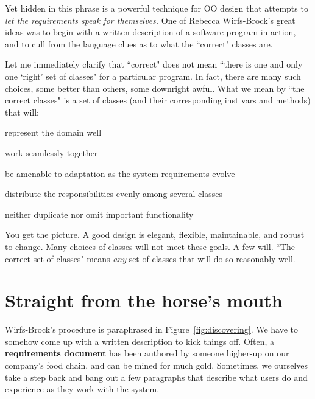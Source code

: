 Yet hidden in this phrase is a powerful technique for OO design that attempts
to \textit{let the requirements speak for themselves.} One of Rebecca
Wirfs-Brock's great ideas was to begin with a written description of a
software program in action, and to cull from the language clues as to what the
``correct" classes are.

Let me immediately clarify that ``correct" does not mean ``there is one and
only one `right' set of classes" for a particular program. In fact, there are
many such choices, some better than others, some downright awful. What we
mean by ``the correct classes" is a set of classes (and their corresponding
inst vars and methods) that will:

\begin{compactitem}
\item represent the domain well
\item work seamlessly together
\item be amenable to adaptation as the system requirements evolve
\item distribute the responsibilities evenly among several classes
\item neither duplicate nor omit important functionality
\end{compactitem}

You get the picture. A good design is elegant, flexible, maintainable, and
robust to change. Many choices of classes will not meet these goals. A few
will. ``The correct set of classes" means \textit{any} set of classes that
will do so reasonably well.

\section{Straight from the horse's mouth}

Wirfs-Brock's procedure is paraphrased in Figure~\ref{fig:discovering}. We
have to somehow come up with a written description to kick things off. Often,
a \textbf{requirements document} has been authored by someone higher-up on our
company's food chain, and can be mined for much gold. Sometimes, we ourselves
take a step back and bang out a few paragraphs that describe what users do and
experience as they work with the system.

